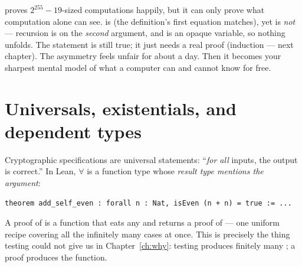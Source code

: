 \begin{pitfall}
 proves $2^{255} - 19$-sized computations happily, but it can only
prove what computation alone can see.  is  (the
definition's first equation matches), yet  is \emph{not} ---
recursion is on the \emph{second} argument, and  is an opaque
variable, so nothing unfolds. The statement is still true; it just needs a
real proof (induction --- next chapter). The asymmetry feels unfair for about
a day. Then it becomes your sharpest mental model of what a computer can and
cannot know for free.
\end{pitfall}

\section{Universals, existentials, and dependent types}

Cryptographic specifications are universal statements: ``\emph{for all}
inputs, the output is correct.'' In Lean, $\forall$ is a function type whose
\emph{result type mentions the argument}:

\begin{lstlisting}[language=Lean]
theorem add_self_even : forall n : Nat, isEven (n + n) = true := ...
\end{lstlisting}

A proof of  is a function that eats any  and
returns a proof of  --- one uniform recipe covering all the
infinitely many cases at once. This is precisely the thing testing could not
give us in Chapter~\ref{ch:why}: testing produces finitely many
; a proof produces the function.

